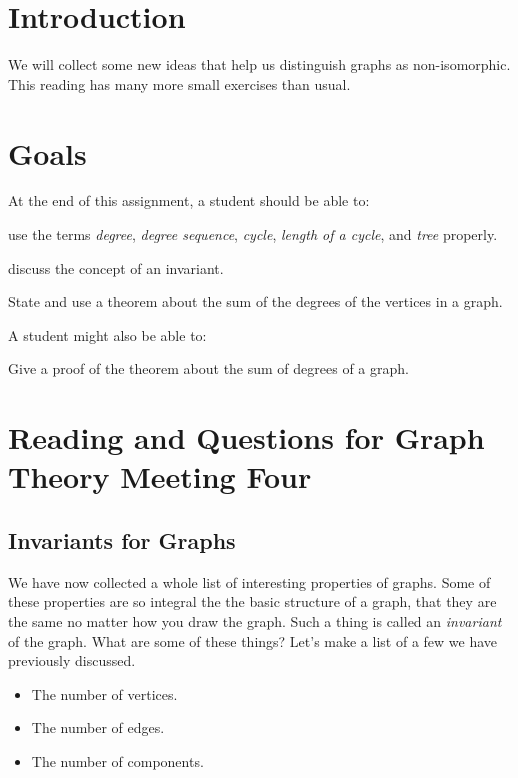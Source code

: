 \documentclass[12pt,letterpaper]{article}
\theoremstyle{definition}
\begin{document}
\setlength{\parskip}{1ex plus 0.5ex minus 0.2ex}
\setlength{\parindent}{0pt}

\pagestyle{fancy}
\cfoot{}

\section*{Introduction}

We will collect some new ideas that help us distinguish graphs as non-isomorphic.  This reading has many more small exercises than usual.

\section*{Goals}
At the end of this assignment, a student should be able to:
\begin{compactitem}
\item use the terms \emph{degree}, \emph{degree sequence}, \emph{cycle}, \emph{length of a cycle}, and \emph{tree} properly.
\item discuss the concept of an invariant.
\item State and use a theorem about the sum of the degrees of the vertices in a graph.
\end{compactitem}
A student might also be able to:
\begin{compactitem}
\item Give a proof of the theorem about the sum of degrees of a graph.
\end{compactitem}

\section*{Reading and Questions for Graph Theory Meeting Four}

\subsection*{Invariants for Graphs}

We have now collected a whole list of interesting properties of graphs. Some of these properties are so integral
the the basic structure of a graph, that they are the same no matter how you draw the graph. Such a thing is
called an \emph{invariant} of the graph. What are some of these things? Let's make a list of a few we have previously discussed.
\begin{itemize}
\item The number of vertices.
\item The number of edges.
\item The number of components.
\end{itemize}
\end{document}
